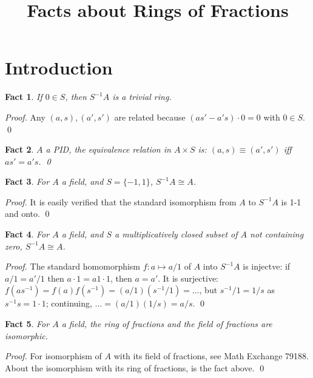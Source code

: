\documentclass{article}
\title{Facts about Rings of Fractions}
\date{}
\newtheorem{theorem}{Fact}[section]
\begin{document}
 

\maketitle

\section{Introduction}

\begin{theorem}
If $0 \in S$, then $S^{-1}A$ is a trivial ring.
\end{theorem}

\noindent
\textit{Proof.} Any $(a, s), (a', s')$ are related because $(as' - a's) \cdot 0 = 0$ with $0 \in S$. \qed

\begin{theorem}
$A$ a PID, the equivalence relation in $ A \times S $ is: $ (a, s) \equiv (a', s') $ iff $ as' = a's $. \qed
\end{theorem}


\vspace{2em}

\begin{theorem}
For $A$ a field, and $S = \{-1, 1\}$, $S^{-1}A \cong A$.
\end{theorem}

\noindent
\textit{Proof.} It is easily verified that the standard isomorphism from $A$ to $S^{-1}A$ is 1-1 and onto. \qed

\begin{theorem}
For $A$ a field, and $S$ a multiplicatively closed subset of $A$ not containing zero, $S^{-1}A \cong A$.
\end{theorem}

\noindent
\textit{Proof.} The standard homomorphism $f:a \mapsto a/1$ of $A$ into $S^{-1}A$ is injectve: if $a/1 = a'/1$ then $a \cdot 1 = a1 \cdot 1$, then $a = a'$. It is surjective: $f(as^{-1}) = f(a)f(s^{-1}) = (a/1)(s^{-1}/1) = \ldots$, but $s^{-1}/1 = 1/s$ as $s^{-1}s = 1 \cdot 1$; continuing, $\ldots = (a/1)(1/s) = a/s$. \qed

\begin{theorem}
For $A$ a field, the ring of fractions and the field of fractions are isomorphic.
\end{theorem}

\noindent
\textit{Proof.} For isomorphism of $A$ with its field of fractions, see Math Exchange 79188. About the isomorphism with its ring of fractions, is the fact above. \qed
\end{document}
